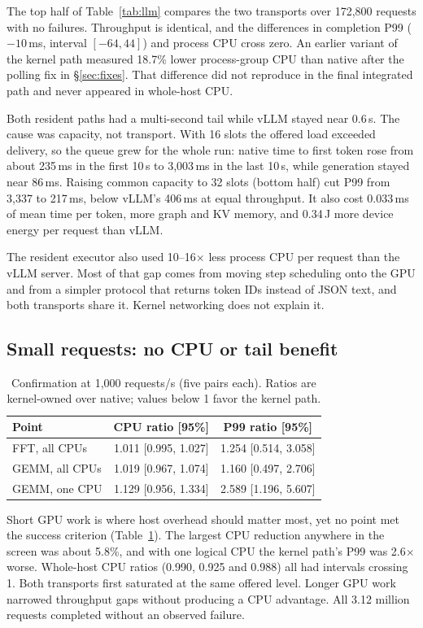 \documentclass[sigconf,nonacm]{acmart}
\begin{document}
The top half of Table~\ref{tab:llm} compares the two transports over 172,800
requests with no failures. Throughput is identical, and the differences in
completion P99 ($-10$\,ms, interval $[-64, 44]$) and process CPU cross zero.
An earlier variant of the kernel path measured 18.7\% lower process-group CPU than native after the polling fix in
\S\ref{sec:fixes}. That difference did not reproduce in the final integrated
path and never appeared in whole-host CPU.

Both resident paths had a multi-second tail while vLLM stayed near 0.6\,s. The
cause was capacity, not transport. With 16 slots the offered load exceeded
delivery, so the queue grew for the whole run: native time to first token rose
from about 235\,ms in the first 10\,s to 3,003\,ms in the last 10\,s, while
generation stayed near 86\,ms. Raising common capacity to 32 slots (bottom
half) cut P99 from 3,337 to 217\,ms, below vLLM's 406\,ms at equal throughput.
It also cost 0.033\,ms of mean time per token, more graph and KV memory, and
0.34\,J more device energy per request than vLLM.

The resident executor also used 10--16$\times$ less process CPU per request
than the vLLM server. Most of that gap comes from moving step scheduling onto
the GPU and from a simpler protocol that returns token IDs instead of JSON
text, and both transports share it. Kernel networking does not explain it.

\subsection{Small requests: no CPU or tail benefit}

\begin{table}[t]
\centering
\small
\caption{Confirmation at 1,000 requests/s (five pairs each). Ratios are
kernel-owned over native; values below 1 favor the kernel path.}
\label{tab:small}
\begin{tabular}{lcc}
\toprule
Point & CPU ratio [95\%] & P99 ratio [95\%] \\
\midrule
FFT, all CPUs & 1.011 [0.995, 1.027] & 1.254 [0.514, 3.058] \\
GEMM, all CPUs & 1.019 [0.967, 1.074] & 1.160 [0.497, 2.706] \\
GEMM, one CPU & 1.129 [0.956, 1.334] & 2.589 [1.196, 5.607] \\
\bottomrule
\end{tabular}
\end{table}

Short GPU work is where host overhead should matter most, yet no point met the
success criterion (Table~\ref{tab:small}). The largest CPU reduction anywhere in
the screen was about 5.8\%, and with one logical CPU the kernel path's P99 was
2.6$\times$ worse. Whole-host CPU ratios (0.990, 0.925 and 0.988) all had
intervals crossing 1. Both transports first saturated at the same offered
level. Longer GPU work narrowed throughput gaps without producing a CPU
advantage. All 3.12 million requests completed without an observed failure.
\end{document}
